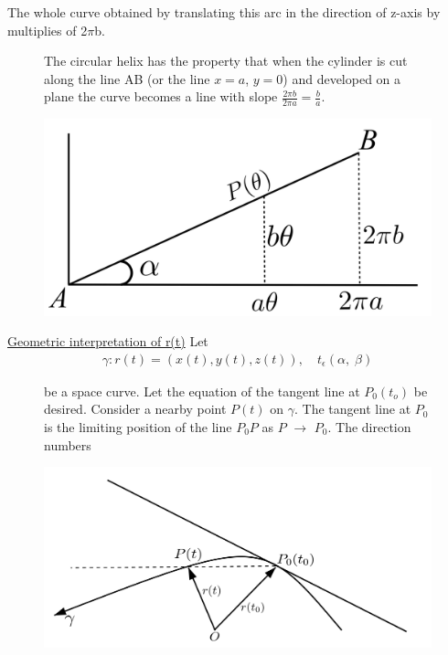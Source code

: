 \documentclass[11pt]{amsbook}
\begin{document}
\begin{exmp}
\begin{figure}[htbp]
\begin{minipage}{0.35\linewidth}
    \end{minipage}
\end{figure}
\par
The whole curve obtained by translating this arc in the direction of z-axis by multiplies of 2$\pi$b.
\begin{figure}[htbp]
\begin{minipage}{0.60\linewidth}
\par
    The circular helix has the property that when the cylinder is cut along the line AB (or the line $x=a$, $y=0$) and developed on a plane the curve becomes a line with slope $\frac{2\pi b}{2\pi a} = \frac{b}{a}$.
\end{minipage}
\begin{minipage}{0.35\linewidth}
    \centering
    \includegraphics[width=0.95\linewidth]{images/middle.png} 
    \end{minipage}
\end{figure}
\end{exmp}
\underline{Geometric interpretation of r(t)} 
Let
\begin{align*}
    \gamma: r(t) = (x(t), y(t), z(t)), \quad t_\epsilon(\alpha, \; \beta)
\end{align*}
\begin{figure}[htbp]
\begin{minipage}{0.52\linewidth}
    be a space curve. Let the equation of the tangent line at $P_0(t_o)$ be desired. Consider a nearby point $P(t)$ on $\gamma$. The tangent line at $P_0$ is the limiting position of the line $P_0P$ as $P$ $\rightarrow$ $P_0$. The direction numbers
\end{minipage}
\begin{minipage}{0.45\linewidth}
    \centering
    \includegraphics[width=1.35\linewidth]{images/last.png} 
    \end{minipage}
\end{figure}
\end{document}
